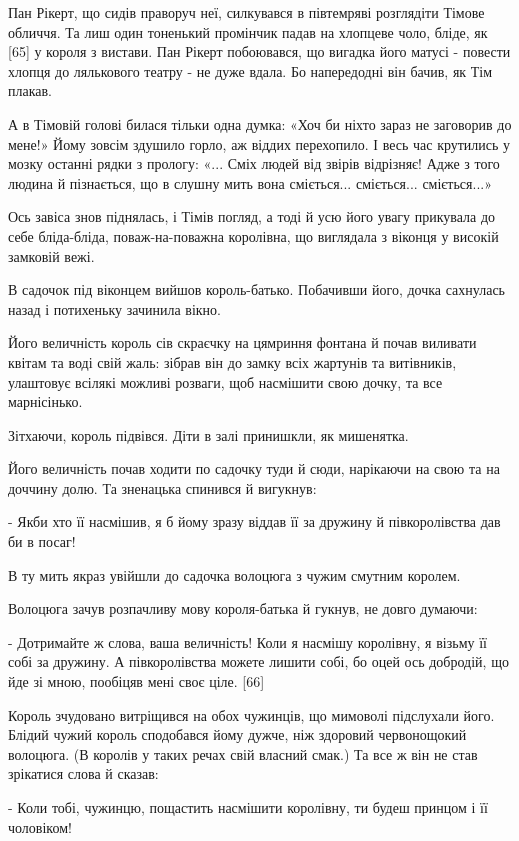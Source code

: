 Пан Рікерт, що сидів праворуч неї, силкувався в півтемряві розглядіти Тімове обличчя. Та лиш один тоненький промінчик падав на хлопцеве чоло, бліде, як [65] у короля з вистави. Пан Рікерт побоювався, що вигадка його матусі - повести хлопця до лялькового театру - не дуже вдала. Бо напередодні він бачив, як Тім плакав.

А в Тімовій голові билася тільки одна думка: «Хоч би ніхто зараз не заговорив до мене!» Йому зовсім здушило горло, аж віддих перехопило. І весь час крутились у мозку останні рядки з прологу: «... Сміх людей від звірів відрізняє! Адже з того людина й пізнається, що в слушну мить вона сміється... сміється... сміється...»

Ось завіса знов піднялась, і Тімів погляд, а тоді й усю його увагу прикувала до себе бліда-бліда, поваж-на-поважна королівна, що виглядала з віконця у високій замковій вежі.

В садочок під віконцем вийшов король-батько. Побачивши його, дочка сахнулась назад і потихеньку зачинила вікно.

Його величність король сів скраєчку на цямриння фонтана й почав виливати квітам та воді свій жаль: зібрав він до замку всіх жартунів та витівників, улаштовує всілякі можливі розваги, щоб насмішити свою дочку, та все марнісінько.

Зітхаючи, король підвівся. Діти в залі принишкли, як мишенятка.

Його величність почав ходити по садочку туди й сюди, нарікаючи на свою та на доччину долю. Та зненацька спинився й вигукнув:

- Якби хто її насмішив, я б йому зразу віддав її за дружину й півкоролівства дав би в посаг!

В ту мить якраз увійшли до садочка волоцюга з чужим смутним королем.

Волоцюга зачув розпачливу мову короля-батька й гукнув, не довго думаючи:

- Дотримайте ж слова, ваша величність! Коли я насмішу королівну, я візьму її собі за дружину. А півкоролівства можете лишити собі, бо оцей ось добродій, що йде зі мною, пообіцяв мені своє ціле. [66]

Король зчудовано витріщився на обох чужинців, що мимоволі підслухали його. Блідий чужий король сподобався йому дужче, ніж здоровий червонощокий волоцюга. (В королів у таких речах свій власний смак.) Та все ж він не став зрікатися слова й сказав:

- Коли тобі, чужинцю, пощастить насмішити королівну, ти будеш принцом і її чоловіком!

